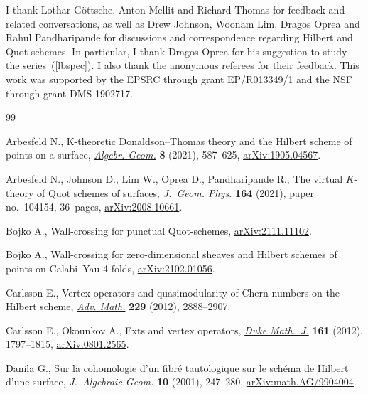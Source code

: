 \documentclass[pdftex]{sigma}
\numberwithin{equation}{section}
\begin{document}
I thank Lothar G\"{o}ttsche, Anton Mellit and Richard Thomas for feedback and related conversations, as well as Drew Johnson, Woonam Lim, Dragos Oprea and Rahul Pandharipande for discussions and correspondence regarding Hilbert and Quot schemes. In particular, I thank Dragos Oprea for his suggestion to study the series~(\ref{lbspec}). I also thank the anonymous referees for their feedback. This work was supported by the EPSRC through grant EP/R013349/1 and the NSF through grant DMS-1902717.

%
%

\begin{thebibliography}{99}
\footnotesize\itemsep=0pt

Arbesfeld N., K-theoretic {D}onaldson--{T}homas theory and the {H}ilbert scheme
 of points on a surface, \href{https://doi.org/10.14231/ag-2021-018}{\textit{Algebr. Geom.}} \textbf{8} (2021), 587--625,
 \href{https://arxiv.org/abs/1905.04567}{arXiv:1905.04567}.

Arbesfeld N., Johnson D., Lim W., Oprea D., Pandharipande R., The virtual
 {$K$}-theory of {Q}uot schemes of surfaces, \href{https://doi.org/10.1016/j.geomphys.2021.104154}{\textit{J.~Geom. Phys.}}
 \textbf{164} (2021), paper no.~104154, 36~pages, \href{https://arxiv.org/abs/2008.10661}{arXiv:2008.10661}.

Bojko A., Wall-crossing for punctual {Q}uot-schemes, \href{https://arxiv.org/abs/2111.11102}{arXiv:2111.11102}.

Bojko A., Wall-crossing for zero-dimensional sheaves and {H}ilbert schemes of
 points on {C}alabi--{Y}au 4-folds, \href{https://arxiv.org/abs/2102.01056}{arXiv:2102.01056}.

Carlsson E., Vertex operators and quasimodularity of {C}hern numbers on the
 {H}ilbert scheme, \href{https://doi.org/10.1016/j.aim.2011.10.003}{\textit{Adv. Math.}} \textbf{229} (2012), 2888--2907.

Carlsson E., Okounkov A., Exts and vertex operators, \href{https://doi.org/10.1215/00127094-1593380}{\textit{Duke Math.~J.}}
 \textbf{161} (2012), 1797--1815, \href{https://arxiv.org/abs/0801.2565}{arXiv:0801.2565}.

Danila G., Sur la cohomologie d'un fibr\'e tautologique sur le sch\'ema de
 {H}ilbert d'une surface, \textit{J.~Algebraic Geom.} \textbf{10} (2001),
 247--280, \href{https://arxiv.org/abs/math.AG/9904004}{arXiv:math.AG/9904004}.


\end{thebibliography}
\end{document}
